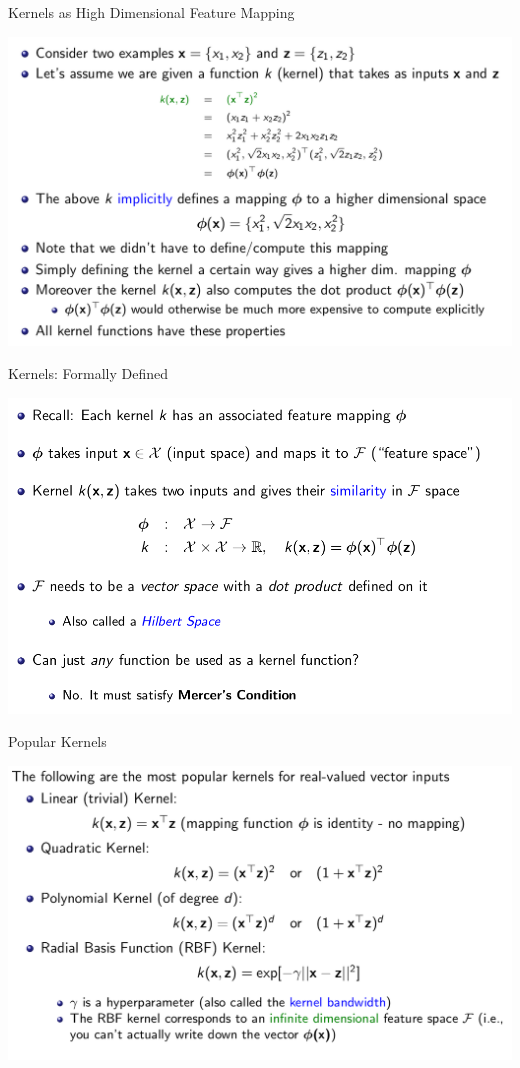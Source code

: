 \documentclass{beamer}
\begin{document}
\begin{frame}{Kernels as High Dimensional Feature Mapping}
    \begin{center}
        \includegraphics[scale=0.32]{kernels5.png}
    \end{center}
\end{frame}
\begin{frame}{Kernels: Formally Defined}
    \begin{center}
        \includegraphics[scale=0.32]{kernels6.png}
    \end{center}
\end{frame}
\begin{frame}{Popular Kernels}
    \begin{center}
        \includegraphics[scale=0.32]{kernels7.png}
    \end{center}
\end{frame}
\end{document}
